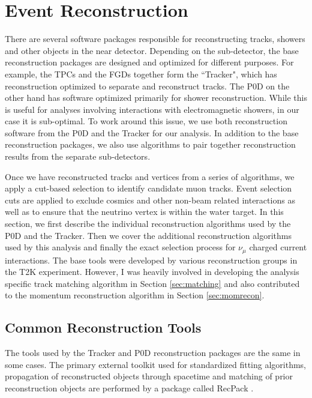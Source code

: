\section{Event Reconstruction}
\label{sec:Reconstruction}

There are several software packages responsible for reconstructing tracks, showers and other objects in the near detector. Depending on the sub-detector, the base reconstruction packages are designed and optimized for different purposes. For example, the TPCs and the FGDs together form the ``Tracker", which has reconstruction optimized to separate and reconstruct tracks. The P0D on the other hand has software optimized primarily for shower reconstruction. While this is useful for analyses involving interactions with electromagnetic showers, in our case it is sub-optimal. To work around this issue, we use both reconstruction software from the P0D and the Tracker for our analysis. In addition to the base reconstruction packages, we also use algorithms to pair together reconstruction results from the separate sub-detectors.

Once we have reconstructed tracks and vertices from a series of algorithms, we apply a cut-based selection to identify candidate muon tracks. Event selection cuts are applied to exclude cosmics and other non-beam related interactions as well as to ensure that the neutrino vertex is within the water target. In this section, we first describe the individual reconstruction algorithms used by the P0D and the Tracker. Then we cover the additional reconstruction algorithms used by this analysis and finally the exact selection process for $\nu_\mu$ charged current interactions. The base tools were developed by various reconstruction groups in the T2K experiment. However, I was heavily involved in developing the analysis specific track matching algorithm in Section \ref{sec:matching} and also contributed to the momentum reconstruction algorithm in Section \ref{sec:momrecon}.

\subsection{Common Reconstruction Tools}
\label{sec:commonrecon}

The tools used by the Tracker and P0D reconstruction packages are the same in some cases. The primary external toolkit used for standardized fitting algorithms, propagation of reconstructed objects through spacetime and matching of prior reconstruction objects are performed by a package called RecPack \cite{recontn}. 

